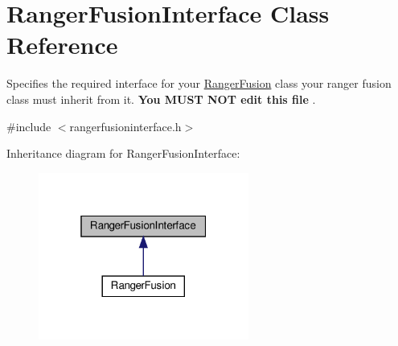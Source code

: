 \hypertarget{classRangerFusionInterface}{}\section{Ranger\+Fusion\+Interface Class Reference}
\label{classRangerFusionInterface}


Specifies the required interface for your \hyperlink{classRangerFusion}{Ranger\+Fusion} class your ranger fusion class must inherit from it. {\bfseries  You M\+U\+ST N\+OT edit this file }.  




{\ttfamily \#include $<$rangerfusioninterface.\+h$>$}



Inheritance diagram for Ranger\+Fusion\+Interface\+:\nopagebreak
\begin{figure}[H]
\begin{center}
\leavevmode
\includegraphics[width=196pt]{classRangerFusionInterface__inherit__graph}
\end{center}
\end{figure}
